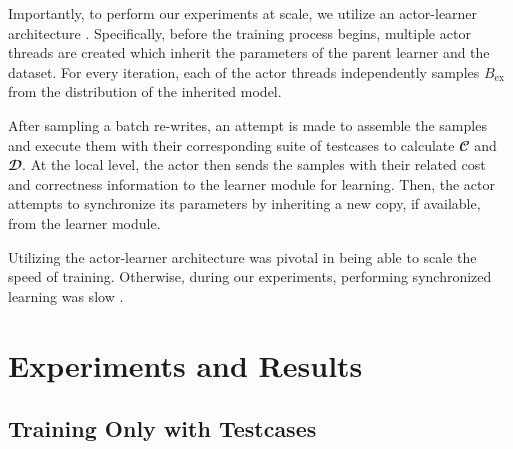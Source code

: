\documentclass{article}
\begin{document}
Importantly, to perform our experiments at scale, we utilize an actor-learner architecture  \citep{liang2018memory, espeholt2018impala}. Specifically, before the training process begins, multiple actor threads are created which inherit the parameters of the parent learner and the dataset. For every iteration, each of the actor threads independently samples $B_{\textrm{ex}}$ from the distribution of the inherited model. 

After sampling a batch re-writes, an attempt is made to assemble the samples and execute them with their corresponding suite of testcases to calculate $\mathbfcal{C}$ and $\mathbfcal{D}$. At the local level, the actor then sends the samples with their related cost and correctness information to the learner module for learning. Then, the actor attempts to synchronize its parameters by inheriting a new copy, if available, from the learner module.


Utilizing the actor-learner architecture was pivotal in being able to scale the speed of training. Otherwise, during our experiments, performing synchronized learning was slow . 


\section{Experiments and Results}


\subsection{Training Only with Testcases}

\end{document}
